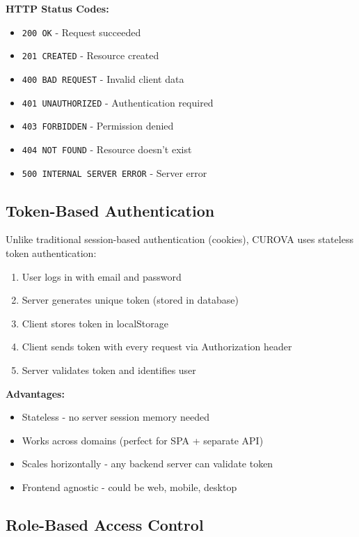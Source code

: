 \documentclass[11pt,a4paper,twoside]{report}
\begin{document}
\textbf{HTTP Status Codes:}
\begin{itemize}
    \item \texttt{200 OK} - Request succeeded
    \item \texttt{201 CREATED} - Resource created
    \item \texttt{400 BAD REQUEST} - Invalid client data
    \item \texttt{401 UNAUTHORIZED} - Authentication required
    \item \texttt{403 FORBIDDEN} - Permission denied
    \item \texttt{404 NOT FOUND} - Resource doesn't exist
    \item \texttt{500 INTERNAL SERVER ERROR} - Server error
\end{itemize}

\subsection{Token-Based Authentication}

Unlike traditional session-based authentication (cookies), CUROVA uses stateless token authentication:

\begin{enumerate}
    \item User logs in with email and password
    \item Server generates unique token (stored in database)
    \item Client stores token in localStorage
    \item Client sends token with every request via Authorization header
    \item Server validates token and identifies user
\end{enumerate}

\textbf{Advantages:}
\begin{itemize}
    \item Stateless - no server session memory needed
    \item Works across domains (perfect for SPA + separate API)
    \item Scales horizontally - any backend server can validate token
    \item Frontend agnostic - could be web, mobile, desktop
\end{itemize}

\subsection{Role-Based Access Control}
\end{document}
